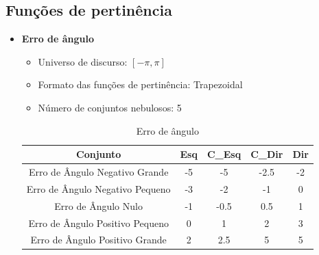    \subsection{Funções de pertinência}
    \begin{itemize}
        \item{\bf{Erro de ângulo}}
            \begin{itemize}
                \item Universo de discurso: $[-\pi,\pi]$
                \item Formato das funções de pertinência: Trapezoidal
                \item Número de conjuntos nebulosos: 5
            \end{itemize}  
            
            \begin{table}[H]
                \centering
                \begin{tabular}{|c|c|c|c|c|}
                    \hline
                    Conjunto                         & Esq   & C\_Esq & C\_Dir & Dir \\ \hline
                    Erro de Ângulo Negativo Grande   & -5    & -5    & -2.5  & -2    \\
                    Erro de Ângulo Negativo Pequeno  & -3    & -2    & -1    & 0     \\
                    Erro de Ângulo Nulo              & -1    & -0.5  & 0.5   & 1     \\
                    Erro de Ângulo Positivo Pequeno  & 0     & 1     & 2     & 3     \\
                    Erro de Ângulo Positivo Grande   & 2     & 2.5   & 5     & 5     \\ \hline
                \end{tabular}
                \caption{Erro de ângulo}
            \end{table}


\end{itemize}
